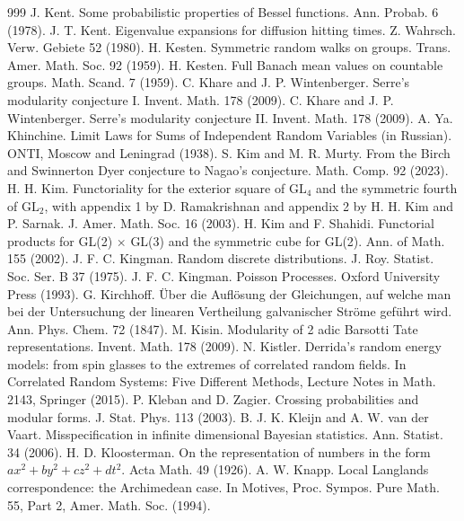 \begin{thebibliography}{999}
 J. Kent. Some probabilistic properties of Bessel functions. Ann. Probab. 6 (1978).
 J. T. Kent. Eigenvalue expansions for diffusion hitting times. Z. Wahrsch. Verw. Gebiete 52 (1980).
 H. Kesten. Symmetric random walks on groups. Trans. Amer. Math. Soc. 92 (1959).
 H. Kesten. Full Banach mean values on countable groups. Math. Scand. 7 (1959).
 C. Khare and J. P. Wintenberger. Serre's modularity conjecture I. Invent. Math. 178 (2009).
 C. Khare and J. P. Wintenberger. Serre's modularity conjecture II. Invent. Math. 178 (2009).
 A. Ya. Khinchine. Limit Laws for Sums of Independent Random Variables (in Russian). ONTI, Moscow and Leningrad (1938).
 S. Kim and M. R. Murty. From the Birch and Swinnerton Dyer conjecture to Nagao's conjecture. Math. Comp. 92 (2023).
 H. H. Kim. Functoriality for the exterior square of $\mathrm{GL}_4$ and the symmetric fourth of $\mathrm{GL}_2$, with appendix 1 by D. Ramakrishnan and appendix 2 by H. H. Kim and P. Sarnak. J. Amer. Math. Soc. 16 (2003).
 H. Kim and F. Shahidi. Functorial products for GL(2) $\times$ GL(3) and the symmetric cube for GL(2). Ann. of Math. 155 (2002).
 J. F. C. Kingman. Random discrete distributions. J. Roy. Statist. Soc. Ser. B 37 (1975).
 J. F. C. Kingman. Poisson Processes. Oxford University Press (1993).
 G. Kirchhoff. \"Uber die Aufl\"osung der Gleichungen, auf welche man bei der Untersuchung der linearen Vertheilung galvanischer Str\"ome gef\"uhrt wird. Ann. Phys. Chem. 72 (1847).
 M. Kisin. Modularity of 2 adic Barsotti Tate representations. Invent. Math. 178 (2009).
 N. Kistler. Derrida's random energy models: from spin glasses to the extremes of correlated random fields. In Correlated Random Systems: Five Different Methods, Lecture Notes in Math. 2143, Springer (2015).
 P. Kleban and D. Zagier. Crossing probabilities and modular forms. J. Stat. Phys. 113 (2003).
 B. J. K. Kleijn and A. W. van der Vaart. Misspecification in infinite dimensional Bayesian statistics. Ann. Statist. 34 (2006).
 H. D. Kloosterman. On the representation of numbers in the form $ax^2+by^2+cz^2+dt^2$. Acta Math. 49 (1926).
 A. W. Knapp. Local Langlands correspondence: the Archimedean case. In Motives, Proc. Sympos. Pure Math. 55, Part 2, Amer. Math. Soc. (1994).

\end{thebibliography}
